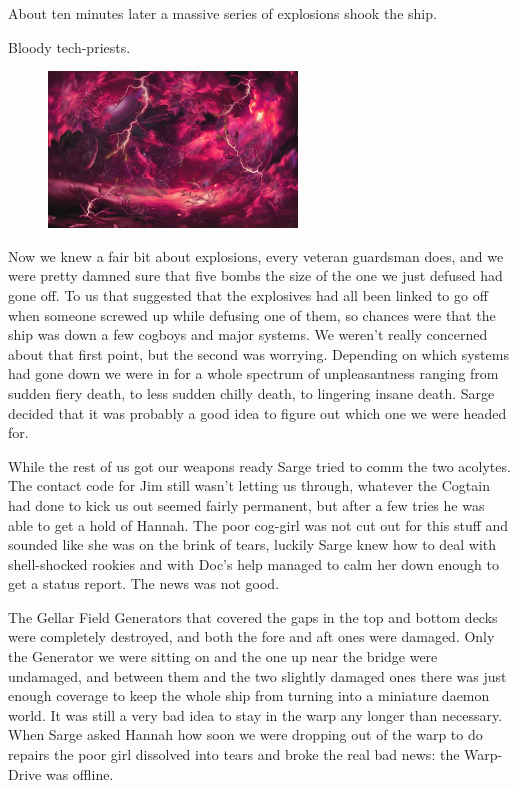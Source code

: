 About ten minutes later a massive series of explosions shook the ship. 


Bloody tech-priests.

\begin{figure}
	\begin{center}
		\includegraphics[width=\figwidth]{pics/7/19.png}
	\end{center}
\end{figure}
Now we knew a fair bit about explosions, every veteran guardsman does, and we were pretty damned sure that five bombs the size of the one we just defused had gone off. 
To us that suggested that the explosives had all been linked to go off when someone screwed up while defusing one of them, so chances were that the ship was down a few cogboys and major systems. 
We weren’t really concerned about that first point, but the second was worrying. 
Depending on which systems had gone down we were in for a whole spectrum of unpleasantness ranging from sudden fiery death, to less sudden chilly death, to lingering insane death. 
Sarge decided that it was probably a good idea to figure out which one we were headed for.

While the rest of us got our weapons ready Sarge tried to comm the two acolytes. 
The contact code for Jim still wasn’t letting us through, whatever the Cogtain had done to kick us out seemed fairly permanent, but after a few tries he was able to get a hold of Hannah. 
The poor cog-girl was not cut out for this stuff and sounded like she was on the brink of tears, luckily Sarge knew how to deal with shell-shocked rookies and with Doc’s help managed to calm her down enough to get a status report. 
The news was not good.

The Gellar Field Generators that covered the gaps in the top and bottom decks were completely destroyed, and both the fore and aft ones were damaged. 
Only the Generator we were sitting on and the one up near the bridge were undamaged, and between them and the two slightly damaged ones there was just enough coverage to keep the whole ship from turning into a miniature daemon world. 
It was still a very bad idea to stay in the warp any longer than necessary. 
When Sarge asked Hannah how soon we were dropping out of the warp to do repairs the poor girl dissolved into tears and broke the real bad news: 
the Warp-Drive was offline.

